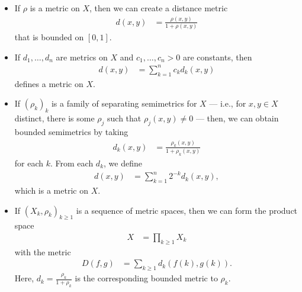 \begin{example}
\begin{itemize}
    \item If $\rho$ is a metric on $X$, then we can create a distance metric
      \begin{align*}
        d\left(x,y\right) &= \frac{\rho\left(x,y\right)}{1 + \rho\left(x,y\right)}
      \end{align*}
      that is bounded on $[0,1]$.
    \item If $d_1,\dots,d_n$ are metrics on $X$ and $c_1,\dots,c_n > 0$ are constants, then
      \begin{align*}
        d\left(x,y\right) &= \sum_{k=1}^{n}c_kd_k\left(x,y\right)
      \end{align*}
      defines a metric on $X$.
    \item If $\left(\rho_k\right)_k$ is a family of separating semimetrics for $X$ --- i.e., for $x,y\in X$ distinct, there is some $\rho_{j}$ such that $\rho_j\left(x,y\right) \neq 0$ --- then, we can obtain bounded semimetrics by taking
      \begin{align*}
        d_k\left(x,y\right) &= \frac{\rho_k\left(x,y\right)}{1 + \rho_k\left(x,y\right)}
      \end{align*}
      for each $k$. From each $d_k$, we define
      \begin{align*}
        d\left(x,y\right) &= \sum_{k=1}^{n}2^{-k}d_k\left(x,y\right),
      \end{align*}
      which is a metric on $X$.
    \item If $\left(X_k,\rho_k\right)_{k\geq 1}$ is a sequence of metric spaces, then we can form the product space
      \begin{align*}
        X &= \prod_{k\geq 1}X_{k}
      \end{align*}
      with the metric
      \begin{align*}
        D\left(f,g\right) &= \sum_{k\geq 1}d_k\left(f(k),g(k)\right).
      \end{align*}
      Here, $d_k = \frac{\rho_k}{1 + \rho_k}$ is the corresponding bounded metric to $\rho_k$.
  \end{itemize}
\end{example}
